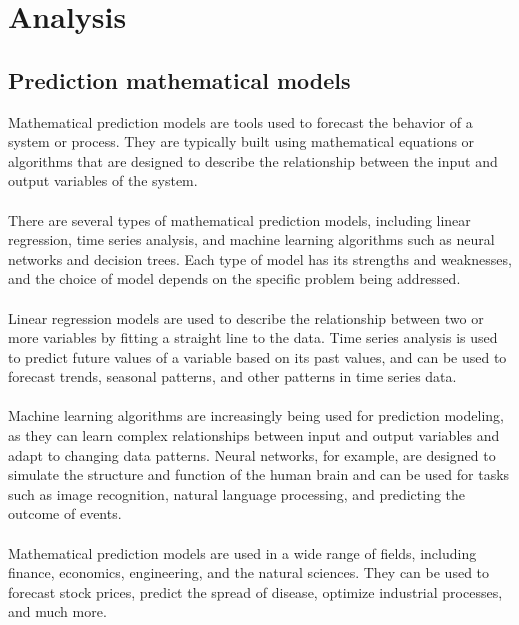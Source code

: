 \chapter{Analysis}\label{analysis}
      \section{Prediction mathematical models}
      Mathematical prediction models are tools used to forecast the behavior of a system or process. They are typically built using mathematical equations or algorithms that are designed to describe the relationship between the input and output variables of the system.\\
    \\
    There are several types of mathematical prediction models, including linear regression, time series analysis, and machine learning algorithms such as neural networks and decision trees. Each type of model has its strengths and weaknesses, and the choice of model depends on the specific problem being addressed.\\
    \\
    Linear regression models are used to describe the relationship between two or more variables by fitting a straight line to the data. Time series analysis is used to predict future values of a variable based on its past values, and can be used to forecast trends, seasonal patterns, and other patterns in time series data.\\
    \\
    Machine learning algorithms are increasingly being used for prediction modeling, as they can learn complex relationships between input and output variables and adapt to changing data patterns. Neural networks, for example, are designed to simulate the structure and function of the human brain and can be used for tasks such as image recognition, natural language processing, and predicting the outcome of events.\\
    \\
    Mathematical prediction models are used in a wide range of fields, including finance, economics, engineering, and the natural sciences. They can be used to forecast stock prices, predict the spread of disease, optimize industrial processes, and much more.
